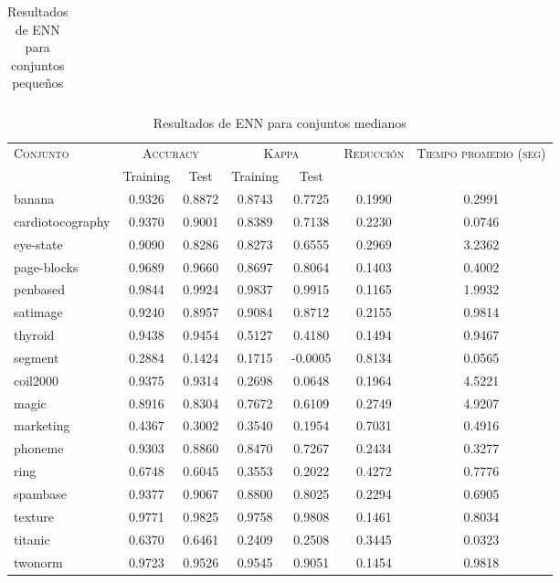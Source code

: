 \begin{table}[]
\begin{tabular}{l c c c c c c}
\hline
\end{tabular}
\caption{Resultados de ENN para conjuntos pequeños }
\label{res-peq-ENN}
\end{table}

\begin{table}[]
\centering
\begin{tabular}{l c c c c c c}
\hline
\multirow{2}{*}{\textsc{Conjunto}}
	& \multicolumn{2}{c}{\textsc{Accuracy}}
	& \multicolumn{2}{c}{\textsc{Kappa}}
	& \textsc{Reducción}
	& \textsc{Tiempo promedio (seg)} \\
	& Training & Test
	& Training & Test \\ 
\hline
\hline

banana & 0.9326 & 0.8872 & 0.8743 & 0.7725 & 0.1990 & 0.2991 \\
cardiotocography & 0.9370 & 0.9001 & 0.8389 & 0.7138 & 0.2230 & 0.0746 \\
eye-state & 0.9090 & 0.8286 & 0.8273 & 0.6555 & 0.2969 & 3.2362 \\
page-blocks & 0.9689 & 0.9660 & 0.8697 & 0.8064 & 0.1403 & 0.4002 \\
penbased & 0.9844 & 0.9924 & 0.9837 & 0.9915 & 0.1165 & 1.9932 \\
satimage & 0.9240 & 0.8957 & 0.9084 & 0.8712 & 0.2155 & 0.9814 \\
thyroid & 0.9438 & 0.9454 & 0.5127 & 0.4180 & 0.1494 & 0.9467 \\
segment & 0.2884 & 0.1424 & 0.1715 & -0.0005 & 0.8134 & 0.0565 \\
coil2000 & 0.9375 & 0.9314 & 0.2698 & 0.0648 & 0.1964 & 4.5221 \\
magic & 0.8916 & 0.8304 & 0.7672 & 0.6109 & 0.2749 & 4.9207 \\
marketing & 0.4367 & 0.3002 & 0.3540 & 0.1954 & 0.7031 & 0.4916 \\
phoneme & 0.9303 & 0.8860 & 0.8470 & 0.7267 & 0.2434 & 0.3277 \\
ring & 0.6748 & 0.6045 & 0.3553 & 0.2022 & 0.4272 & 0.7776 \\
spambase & 0.9377 & 0.9067 & 0.8800 & 0.8025 & 0.2294 & 0.6905 \\
texture & 0.9771 & 0.9825 & 0.9758 & 0.9808 & 0.1461 & 0.8034 \\
titanic & 0.6370 & 0.6461 & 0.2409 & 0.2508 & 0.3445 & 0.0323 \\
twonorm & 0.9723 & 0.9526 & 0.9545 & 0.9051 & 0.1454 & 0.9818 \\

\hline
\end{tabular}
\caption{Resultados de ENN para conjuntos medianos }
\label{res-med-ENN}
\end{table}

